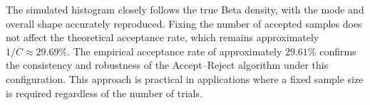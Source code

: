 
The simulated histogram closely follows the true Beta density, with the mode and overall shape accurately reproduced. Fixing the number of accepted samples does not affect the theoretical acceptance rate, which remains approximately \(1/C \approx 29.69\%\). The empirical acceptance rate of approximately \(29.61\%\) confirms the consistency and robustness of the Accept–Reject algorithm under this configuration. 
This approach is practical in applications where a fixed sample size is required regardless of the number of trials.









